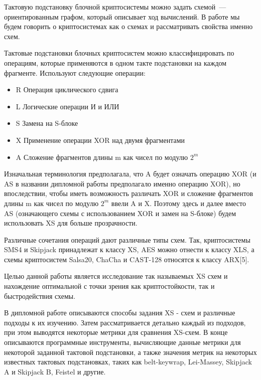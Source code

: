\documentclass[a4paper,12pt]{report}
\theoremstyle{plain} %
\theoremstyle{definition}
\theoremstyle{remark}
\begin{document}
\begin{large}
Тактовую подстановку блочной криптосистемы можно задать схемой~---
ориентированным графом, который описывает ход вычислений. В работе мы будем говорить о криптосистемах как о схемах и рассматривать свойства именно схем.

Тактовые подстановки блочных криптосистем можно классифицировать по операциям, которые применяются в одном такте подстановки на каждом фрагменте. Используют следующие операции:

\begin{itemize}
\item R
\newline Операция циклического сдвига
\item L
\newline Логические операции И и ИЛИ
\item S
\newline Замена на S-блоке
\item X
\newline Применение операции XOR над двумя фрагментами
\item A
\newline Сложение фрагментов длины m как чисел по модулю $2^m$
\end{itemize}

Изначальная терминология предполагала, что A будет означать операцию XOR (и AS в названии дипломной работы предполагало именно операцию XOR), но впоследствии, чтобы иметь возможность различать XOR и сложение фрагментов длины m как чисел по модулю $2^m$ ввели A и X. Поэтому здесь и далее вместо AS (означающего схемы с использованием XOR и замен на S-блоке) будем использовать XS для больше прозрачности.

Различные сочетания операций дают различные типы схем. Так, криптосистемы SMS4 и Skipjack принадлежат к классу XS, AES можно отнести к классу XLS, а схемы криптосистем Salsa20, ChaCha и CAST-128 относятся к классу ARX[5].

Целью данной работы является исследование так называемых XS схем и нахождение оптимальной с точки зрения как криптостойкости, так и быстродействия схемы.

В дипломной работе описываются способы задания XS - схем и различные подходы к их изучению. Затем рассматривается детально каждый из подходов, при этом выводятся некоторые метрики для сравнения XS-схем. В конце описываются программные инструменты, вычисляющие данные метрики для некоторой заданной тактовой подстановки, а также значения метрик на некоторых известных тактовых подстановках, таких как belt-keywrap, Lei-Massey, Skipjack A и Skipjack B, Feistel и другие.


\end{large}
\end{document}
